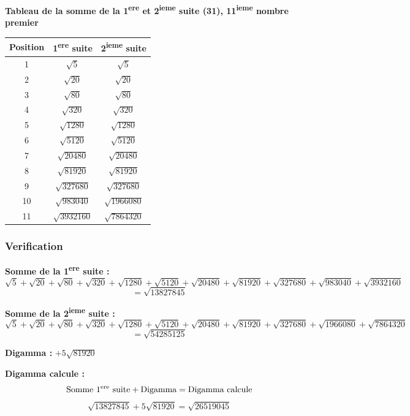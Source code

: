 \documentclass[a4paper,11pt]{article}
\begin{document}
\begin{center}
\textbf{Tableau de la somme de la 1\textsuperscript{ere} et 2\textsuperscript{ieme} suite (31), 11\textsuperscript{ieme} nombre premier}
\end{center}

\begin{center}
\small
\begin{tabular}{|c|c|c|}
\hline
\textbf{Position} & \textbf{1\textsuperscript{ere} suite} & \textbf{2\textsuperscript{ieme} suite} \\
\hline
1 & $\sqrt{5}$ & $\sqrt{5}$ \\
\hline
2 & $\sqrt{20}$ & $\sqrt{20}$ \\
\hline
3 & $\sqrt{80}$ & $\sqrt{80}$ \\
\hline
4 & $\sqrt{320}$ & $\sqrt{320}$ \\
\hline
5 & $\sqrt{1280}$ & $\sqrt{1280}$ \\
\hline
6 & $\sqrt{5120}$ & $\sqrt{5120}$ \\
\hline
7 & $\sqrt{20480}$ & $\sqrt{20480}$ \\
\hline
8 & $\sqrt{81920}$ & $\sqrt{81920}$ \\
\hline
9 & $\sqrt{327680}$ & $\sqrt{327680}$ \\
\hline
10 & $\sqrt{983040}$ & $\sqrt{1966080}$ \\
\hline
11 & $\sqrt{3932160}$ & $\sqrt{7864320}$ \\
\hline
\end{tabular}
\end{center}

\subsubsection{Verification}

\textbf{Somme de la 1\textsuperscript{ere} suite :}
\[
\sqrt{5} + \sqrt{20} + \sqrt{80} + \sqrt{320} + \sqrt{1280} + \sqrt{5120} + \sqrt{20480} + \sqrt{81920} + \sqrt{327680} + \sqrt{983040} + \sqrt{3932160}
\]
\[
= \sqrt{13827845}
\]

\textbf{Somme de la 2\textsuperscript{ieme} suite :}
\[
\sqrt{5} + \sqrt{20} + \sqrt{80} + \sqrt{320} + \sqrt{1280} + \sqrt{5120} + \sqrt{20480} + \sqrt{81920} + \sqrt{327680} + \sqrt{1966080} + \sqrt{7864320}
\]
\[
= \sqrt{54285125}
\]

\textbf{Digamma :} $+5\sqrt{81920}$

\textbf{Digamma calcule :}
\[
\text{Somme 1\textsuperscript{ere} suite} + \text{Digamma} = \text{Digamma calcule}
\]
\[
\sqrt{13827845} + 5\sqrt{81920} = \sqrt{26519045}
\]
\end{document}
